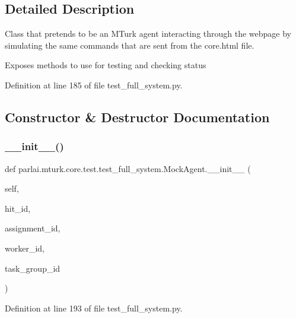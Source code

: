 \subsection{Detailed Description}
\begin{DoxyVerb}Class that pretends to be an MTurk agent interacting through the webpage by
simulating the same commands that are sent from the core.html file.

Exposes methods to use for testing and checking status
\end{DoxyVerb}
 

Definition at line 185 of file test\+\_\+full\+\_\+system.\+py.



\subsection{Constructor \& Destructor Documentation}
\mbox{\label{classparlai_1_1mturk_1_1core_1_1test_1_1test__full__system_1_1MockAgent_a68f39f241ca2ab60cc7bb93b282e84d7}} 
\subsubsection{\texorpdfstring{\+\_\+\+\_\+init\+\_\+\+\_\+()}{\_\_init\_\_()}}
{\footnotesize\ttfamily def parlai.\+mturk.\+core.\+test.\+test\+\_\+full\+\_\+system.\+Mock\+Agent.\+\_\+\+\_\+init\+\_\+\+\_\+ (\begin{DoxyParamCaption}\item[{}]{self,  }\item[{}]{hit\+\_\+id,  }\item[{}]{assignment\+\_\+id,  }\item[{}]{worker\+\_\+id,  }\item[{}]{task\+\_\+group\+\_\+id }\end{DoxyParamCaption})}



Definition at line 193 of file test\+\_\+full\+\_\+system.\+py.


